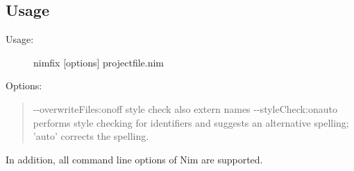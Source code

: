 \hypertarget{usage}{%
\subsection{Usage}\label{usage}}

\begin{description}
\item[Usage:]
nimfix {[}options{]} projectfile.nim
\end{description}

Options:

\begin{quote}
-\/-overwriteFiles:onoff style check also extern names
-\/-styleCheck:onauto performs style checking for identifiers and
suggests an alternative spelling; 'auto' corrects the spelling.
\end{quote}

In addition, all command line options of Nim are supported.
